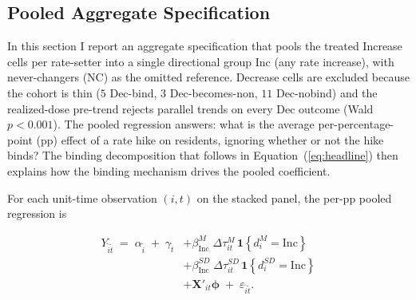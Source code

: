 \documentclass[12pt]{article}
\begin{document}
\subsection{Pooled Aggregate Specification}
\label{subsec:pooled-spec}

In this section I report an aggregate specification that pools the
treated Increase cells per rate-setter into a single directional group
$\text{Inc}$ (any rate increase), with never-changers (NC) as the omitted reference. Decrease cells
are excluded because the cohort is
thin ($5$ Dec-bind, $3$ Dec-becomes-non, $11$ Dec-nobind) and the
realized-dose pre-trend rejects parallel trends on every Dec outcome
(Wald $p<0.001$). The pooled
regression answers: what is the average per-percentage-point (pp)
effect of a rate hike on residents, ignoring whether or not the
hike binds? The binding decomposition that follows in
Equation~(\ref{eq:headline}) then explains how the binding mechanism drives the pooled coefficient.

For each unit-time observation $(i, t)$ on the stacked panel, the
per-pp pooled regression is

\begin{equation}
\begin{split}
Y_{\tilde i \tilde t} \;=\; \alpha_{\tilde i} \;+\; \gamma_{\tilde t}
&+ \beta^{M}_{\text{Inc}}\;\Delta\tau^{M}_{it}\,\mathbf{1}\!\left\{d^{M}_{i} = \text{Inc}\right\} \\
&+ \beta^{SD}_{\text{Inc}}\;\Delta\tau^{SD}_{it}\,\mathbf{1}\!\left\{d^{SD}_{i} = \text{Inc}\right\} \\
&+ \mathbf{X}'_{it}\boldsymbol{\phi}
\;+\; \varepsilon_{\tilde i \tilde t}.
\end{split}
\label{eq:pooled}
\end{equation}
\end{document}
